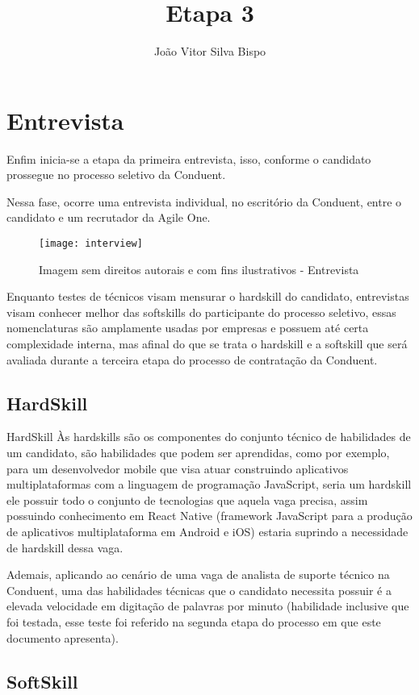 \documentclass[12pt]{article}
\author{João Vitor Silva Bispo}
\title{Etapa 3}
\begin{document}
\maketitle

\section{Entrevista}
Enfim inicia-se a etapa da primeira entrevista, isso, conforme o candidato prossegue no processo seletivo da Conduent. 

Nessa fase, ocorre uma entrevista individual, no escritório da Conduent, entre o candidato e um recrutador da Agile One.

\begin{figure}[h]
	\centering
	\texttt{[image: interview]}
	\caption{Imagem sem direitos autorais e com fins ilustrativos - Entrevista}
	\label{fig:mesh1}
\end{figure}
Enquanto testes de técnicos visam mensurar o hardskill do candidato, entrevistas visam conhecer melhor das softskills do participante do processo seletivo, essas nomenclaturas são amplamente usadas por empresas e possuem até certa complexidade interna, mas afinal do que se trata o hardskill e a softskill que será avaliada durante a terceira etapa do processo de contratação da Conduent.

\subsection{HardSkill}
HardSkill
Às hardskills são os componentes do conjunto técnico de habilidades de um candidato, são habilidades que podem ser aprendidas, como por exemplo, para um desenvolvedor mobile que visa atuar construindo aplicativos multiplataformas com a linguagem de programação JavaScript, seria um hardskill ele possuir todo o conjunto de tecnologias que aquela vaga precisa, assim possuindo conhecimento em React Native (framework JavaScript para a produção de aplicativos multiplataforma em Android e iOS) estaria suprindo a necessidade de hardskill dessa vaga. 

Ademais, aplicando ao cenário de uma vaga de analista de suporte técnico na Conduent, uma das habilidades técnicas que o candidato necessita possuir é a elevada velocidade em digitação de palavras por minuto (habilidade inclusive que foi testada, esse teste foi referido na segunda etapa do processo em que este documento apresenta).

\subsection{SoftSkill}
\end{document}
